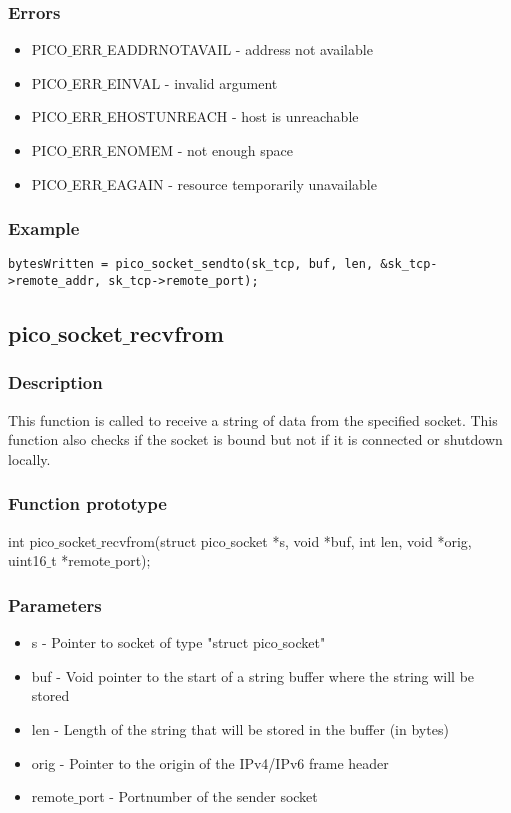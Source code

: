 \subsubsection*{Errors}
\begin{itemize}
\item PICO$\_$ERR$\_$EADDRNOTAVAIL - address not available
\item PICO$\_$ERR$\_$EINVAL - invalid argument
\item PICO$\_$ERR$\_$EHOSTUNREACH - host is unreachable
\item PICO$\_$ERR$\_$ENOMEM - not enough space
\item PICO$\_$ERR$\_$EAGAIN - resource temporarily unavailable
\end{itemize}

\subsubsection*{Example}
\begin{verbatim}
bytesWritten = pico_socket_sendto(sk_tcp, buf, len, &sk_tcp->remote_addr, sk_tcp->remote_port);
\end{verbatim}


\subsection{pico$\_$socket$\_$recvfrom}

\subsubsection*{Description}
This function is called to receive a string of data from the specified socket.
This function also checks if the socket is bound but not if it is connected or shutdown locally. 

\subsubsection*{Function prototype}
int pico$\_$socket$\_$recvfrom(struct pico$\_$socket *s, void *buf, int len, void *orig, uint16$\_$t *remote$\_$port);

\subsubsection*{Parameters}
\begin{itemize}
\item s - Pointer to socket of type "struct pico$\_$socket"
\item buf - Void pointer to the start of a string buffer where the string will be stored
\item len - Length of the string that will be stored in the buffer (in bytes)
\item orig - Pointer to the origin of the IPv4/IPv6 frame header
\item remote$\_$port - Portnumber of the sender socket 
\end{itemize}

